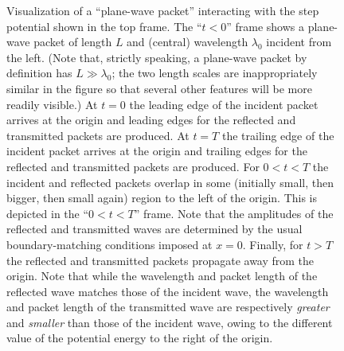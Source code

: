 \documentclass[aps,prc,twocolumn,letterpaper,floatfix]{revtex4}
\begin{document}
\begin{figure}[t]
\begin{center}
\caption{Visualization of a ``plane-wave packet'' interacting with the
step potential shown in the top frame.  The ``$t<0$'' frame shows a
plane-wave packet of length $L$ and (central) wavelength $\lambda_0$
incident from the left.  (Note that, strictly speaking, a plane-wave
packet by definition has $L \gg \lambda_0$; the two length scales
are inappropriately similar in the figure so that several other features
will be more readily visible.)  At $t=0$ the leading edge of the
incident packet arrives at the origin and leading edges for the
reflected and transmitted packets are produced.  At $t=T$ the
trailing edge of the incident packet arrives at the origin and
trailing edges for the reflected and transmitted packets are
produced.  For $0 < t < T$ the incident and reflected packets
overlap in some (initially small, then bigger, then small again)
region to the left of the origin.  This is depicted in the
``$0<t<T$'' frame.  Note that the amplitudes of the reflected and
transmitted waves are determined by the usual boundary-matching
conditions imposed at $x=0$.  Finally, for $t>T$ the reflected and
transmitted packets propagate away from the origin.  Note that while
the wavelength and packet length of the reflected wave matches those
of the incident wave, the wavelength and packet length of the transmitted wave are
respectively \emph{greater} and \emph{smaller} than those of the
incident wave, owing to the different value of the potential energy to
the right of the origin. 
\label{fig1}
}
\end{center}
\end{figure}
\end{document}
